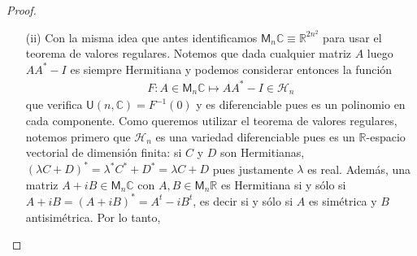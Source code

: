 \documentclass[11pt]{article}
\newcommand{\R}{\mathbb{R}}
\newcommand{\C}{\mathbb{C}}
\newcommand{\M}[2]{\mathsf{M}_{#1}#2}
\newcommand{\nat}[1]{[\![#1]\!]}
\newcommand{\adj}[1]{\operatorname{adj}(#1)}
\begin{document}
\begin{proof}
\begin{itemize}
\begin{align*}
D_A = \begin{pmatrix}
R_{11} & R_{12} & \dots & R_{1n} & R_{21} & \dots & R_{nn} & -I_{11} & \dots & -I_{nn} \\
I_{11} & I_{12} & \dots & I_{1n} & I_{21} & \dots & I_{nn} & R_{11} & \dots & R_{nn}
\end{pmatrix}.
\end{align*}
Si $D_A$ no fuera sobreyectivo, entonces o bien $D_A = 0$ o bien $D_A$ es de rango $1$. Veamos que esto \'ultimo (tambi\'en) implica $\adj{A} = 0$. En efecto, si $\operatorname{rg} D_A = 1$ entonces las filas del diferencial son linealmente dependientes y en consecuencia, existe $\lambda \neq 0$ tal que 
\begin{align*}
\begin{cases}
\quad R_{kl} = \lambda I_{kl}\\
- \ I_{kl} = \lambda R_{kl}
\end{cases}
\end{align*}
para cada $k,l \in \nat{n}$. De aqu\'i concluimos que $R_{kl} = - \lambda^2 R_{kl}$ y por lo tanto $R_{kl}(1+\lambda^2) = 0$ as\'i que $R_{kl} = 0$ e $I_{kl} = -\lambda R_{kl} = 0$. Ahora bien, si $A \in \mathsf{SL}(n,\C)$ luego es
\begin{align*}
I = 1 \cdot I = \det(A) I = A \adj{A},
\end{align*}
y no puede ser entonces $\adj{A} = 0$. En consecuencia, $D_A$ siempre es sobreyectivo cuando $A$ es un elemento de $\mathsf{SL}(n,\C)$ y por lo tanto, el teorema de valores regulares nos asegura que esta \'ultima es variedad diferenciable de dimensi\'on $2n^2 - 2 = 2(n^2-1)$.
\item[(ii)] Con la misma idea que antes identificamos $\M{n}{\C} \equiv \R^{2n^2}$ para usar el teorema de valores regulares. Notemos que dada cualquier matriz $A$ luego $AA^* -I$ es siempre Hermitiana y podemos considerar entonces la funci\'on
\begin{align*}
F : A \in \M{n}{\C} \mapsto AA^* -I \in \mathcal{H}_n
\end{align*}
que verifica $\mathsf{U}(n,\C) = F^{-1}(0)$ y es diferenciable pues es un polinomio en cada componente. Como queremos utilizar el teorema de valores regulares, notemos primero que $\mathcal{H}_n$ es una variedad diferenciable pues es un $\R$-espacio vectorial de dimensi\'on finita: si $C$ y $D$ son Hermitianas, $(\lambda C+D)^* = \lambda^*C^*+D^* = \lambda C+D$ pues justamente $\lambda$ es real. Adem\'as, una matriz $A+iB \in \M{n}{\C}$ con $A,B \in \M{n}{\R}$ es Hermitiana si y s\'olo si $A+iB = (A+iB)^* = A^t-iB^t$, es decir si y s\'olo si $A$ es sim\'etrica y $B$ antisim\'etrica. Por lo tanto,

\end{itemize}
\end{proof}
\end{document}
